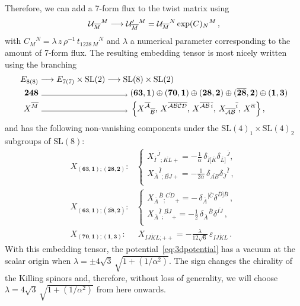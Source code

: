 \documentclass[a4paper, 11pt]{article}
\numberwithin{equation}{section}
\newcommand{\ov}[1]{\overline{#1}}
\newcommand{\SL}[1]{\mathrm{SL}( #1 )}
\newcommand{\EE}{\ensuremath{E_{8(8)}}\xspace}
\newcommand{\+}{\oplus}
\newcommand{\cU}{{\cal U}}
\newcommand{\fl}[1]{\ov{#1}}
\begin{document}
Therefore, we can add a 7-form flux to the twist matrix using
\begin{equation}
	\cU_{\fl{M}}{}^M \longrightarrow \cU'_{\fl{M}}{}^M = \cU_{\fl{M}}{}^N \exp(C)_N{}^M \,,
\end{equation}
with $C_M{}^N = \lambda\, z\,\rho^{-1}\, t_{1238\,M}{}^N$ and $\lambda$ a numerical parameter corresponding to the amount of 7-form flux. The resulting embedding tensor is most nicely written using the branching
\begin{equation} \label{eq:248decompoinSL8}
	\begin{aligned}
		\EE & \longrightarrow E_{7(7)}\times {\rm SL}(2) \longrightarrow {\rm SL}(8) \times {\rm SL}(2) \\
		\mathbf{248} & \ \tikz{\draw[arrows={->[scale=1.1]}] (0,0) -- (3.65
	,0);}\  (\mathbf{63},\mathbf{1}) \oplus (\mathbf{70},\mathbf{1}) \oplus (\mathbf{28},\mathbf{2}) \oplus (\mathbf{\fl{28}},\mathbf{2}) \oplus (\mathbf{1},\mathbf{3}) \\
		X^{\fl{M}} & \ \tikz{\draw[arrows={->[scale=1.1]}] (0,0) -- (3.65
	,0);}\ \left\{X^{\fl{\cal A}}{}_{\fl{\cal B}},\,X^{\fl{\cal ABCD}},\,X^{\fl{\cal AB}\,\fl{i}},\,X_{\fl{\cal AB}}{}^{\fl{i}},\,X^{\fl{\alpha}}\right\},
	\end{aligned}
\end{equation}
and has the following non-vanishing components under the $\SL{4}_1 \times \SL{4}_2$ subgroups of $\SL{8}$:
\begin{equation} \label{eq:embeddingtensor@origin}
	\begin{split}
		X_{(\mathbf{63},\mathbf{1});(\mathbf{28},\mathbf{2})}:&
		\begin{cases}
			\displaystyle X_{\fl{I}}{}^{\fl{J}}{}_{;\fl{KL}+}=-\frac{1}{\alpha}\,\delta_{\fl{I}[\fl{K}}\delta_{\fl{L}]}{}^{\fl{J}},\\[7pt]
			\displaystyle X_{\fl{A}}{}^{\fl{I}}{}_{;\fl{BJ}+}=-\frac{1}{2\alpha}\,\delta_{\fl{AB}}\delta_{\fl{J}}{}^{\fl{I}}\,,\\
		\end{cases} \\[5pt]
		X_{(\mathbf{63},\mathbf{1});(\mathbf{\fl{28}},\mathbf{2})}:&
		\begin{cases}
			\displaystyle X_{\fl{A}}{}^{\fl{B}}{}_{;}{}^{\fl{CD}}{}_{+}=-\,\delta_{\fl{A}}{}^{[\fl{C}}\delta^{\fl{D}]\fl{B}}\,,\\[7pt]
			\displaystyle X_{\fl{A}}{}^{\fl{I}}{}_{;}{}^{\fl{BJ}}{}_{+}=-\frac{1}{2}\,\delta_{\fl{A}}{}^{\fl{B}}\delta^{\fl{IJ}}\,,\\
		\end{cases} \\[5pt]
		X_{(\mathbf{70},\mathbf{1});(\mathbf{1},\mathbf{3})}:&\  X_{\fl{IJKL};++} = -\frac{\lambda}{12\sqrt{6}}\,\varepsilon_{\fl{IJKL}}\,.
	\end{split}
\end{equation}
With this embedding tensor, the potential~\eqref{eq:3dpotential} has a vacuum at the scalar origin when $\lambda=\pm 4\sqrt{3}\,\sqrt{1+(1/\alpha^{2})}$. The sign changes the chirality of the Killing spinors and, therefore, without loss of generality, we will choose $\lambda = 4\sqrt{3}\,\sqrt{1+(1/\alpha^{2})}$ from here onwards.
\end{document}
